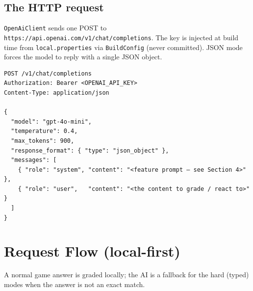\documentclass[11pt,a4paper]{article}
\begin{document}
\subsection{The HTTP request}

\texttt{OpenAiClient} sends one POST to
\texttt{https://api.openai.com/v1/chat/completions}. The key is injected at
build time from \texttt{local.properties} via \texttt{BuildConfig} (never
committed). JSON mode forces the model to reply with a single JSON object.

\begin{Verbatim}
POST /v1/chat/completions
Authorization: Bearer <OPENAI_API_KEY>
Content-Type: application/json

{
  "model": "gpt-4o-mini",
  "temperature": 0.4,
  "max_tokens": 900,
  "response_format": { "type": "json_object" },
  "messages": [
    { "role": "system", "content": "<feature prompt — see Section 4>" },
    { "role": "user",   "content": "<the content to grade / react to>" }
  ]
}
\end{Verbatim}

\section{Request Flow (local-first)}

A normal game answer is graded locally; the AI is a fallback for the hard
(typed) modes when the answer is not an exact match.
\end{document}
